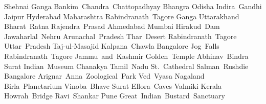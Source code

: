 \answerkey
{} Shehnai
 Ganga
 Bankim Chandra Chattopadhyay
 Bhangra
 Odisha
 Indira Gandhi
 Jaipur
 Hyderabad
 Maharashtra
 Rabindranath Tagore
 Ganga
 Uttarakhand
 Bharat Ratna
 Rajendra Prasad
 Ahmedabad
 Mumbai
 Hirakud Dam
 Jawaharlal Nehru
 Arunachal Pradesh
 Thar Desert
 Rabindranath Tagore
 Uttar Pradesh
 Taj‑ul‑Masajid
 Kalpana Chawla
 Bangalore
 Jog Falls
 Rabindranath Tagore
 Jammu and Kashmir
 Golden Temple
 Abhinav Bindra
 Surat
 Indian Museum
 Chanakya
 Tamil Nadu
 St. Cathedral
 Salman Rushdie
 Bangalore
 Arignar Anna Zoological Park
 Ved Vyasa
 Nagaland
 Birla Planetarium
 Vinoba Bhave
 Surat
 Ellora Caves
 Valmiki
 Kerala
 Howrah Bridge
 Ravi Shankar
 Pune
 Great Indian Bustard Sanctuary
\endanswerkey